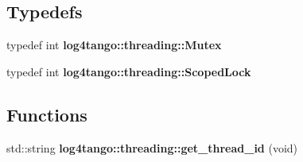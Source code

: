 \subsection*{Typedefs}
\begin{DoxyCompactItemize}
\item 
typedef int {\bf log4tango\-::threading\-::\-Mutex}
\item 
typedef int {\bf log4tango\-::threading\-::\-Scoped\-Lock}
\end{DoxyCompactItemize}
\subsection*{Functions}
\begin{DoxyCompactItemize}
\item 
std\-::string {\bf log4tango\-::threading\-::get\-\_\-thread\-\_\-id} (void)
\end{DoxyCompactItemize}
